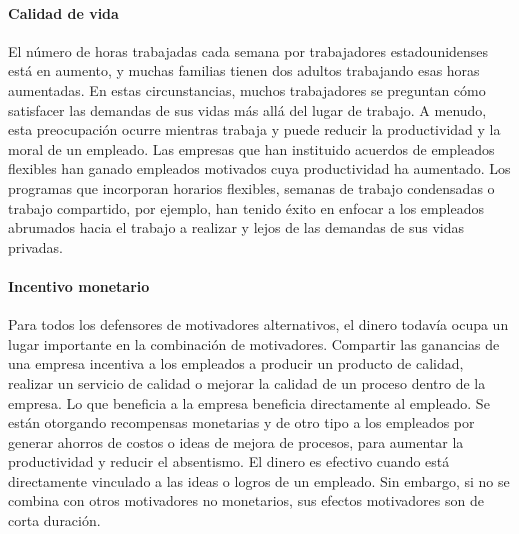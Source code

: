 \documentclass[10pt]{book}
\begin{document}
\paragraph{Calidad de vida} El número de horas trabajadas cada semana por trabajadores estadounidenses está en aumento, y muchas familias tienen dos adultos trabajando esas horas aumentadas. En estas circunstancias, muchos trabajadores se preguntan cómo satisfacer las demandas de sus vidas más allá del lugar de trabajo. A menudo, esta preocupación ocurre mientras trabaja y puede reducir la productividad y la moral de un empleado. Las empresas que han instituido acuerdos de empleados flexibles han ganado empleados motivados cuya productividad ha aumentado. Los programas que incorporan horarios flexibles, semanas de trabajo condensadas o trabajo compartido, por ejemplo, han tenido éxito en enfocar a los empleados abrumados hacia el trabajo a realizar y lejos de las demandas de sus vidas privadas.\\
\paragraph{Incentivo monetario}Para todos los defensores de motivadores alternativos, el dinero todavía ocupa un lugar importante en la combinación de motivadores. Compartir las ganancias de una empresa incentiva a los empleados a producir un producto de calidad, realizar un servicio de calidad o mejorar la calidad de un proceso dentro de la empresa. Lo que beneficia a la empresa beneficia directamente al empleado. Se están otorgando recompensas monetarias y de otro tipo a los empleados por generar ahorros de costos o ideas de mejora de procesos, para aumentar la productividad y reducir el absentismo. El dinero es efectivo cuando está directamente vinculado a las ideas o logros de un empleado. Sin embargo, si no se combina con otros motivadores no monetarios, sus efectos motivadores son de corta duración. \\
\end{document}

